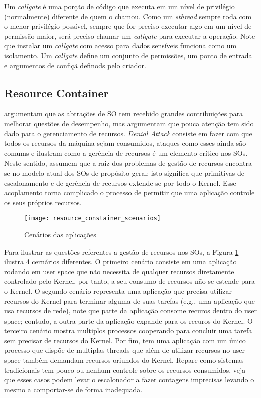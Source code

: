 Um \emph{callgate} é uma porção de código que executa em um nível de privilégio
(normalmente) diferente de quem o chamou. Como um \emph{sthread} sempre roda
com o menor privilégio possível, sempre que for preciso executar algo em um
nível de permissão maior, será preciso chamar um \emph{callgate} para executar
a operação. Note que instalar um \emph{callgate} com acesso para dados
sensíveis funciona como um isolamento. Um \emph{callgate} define um conjunto de
permissões, um ponto de entrada e argumentos de confiçã definods pelo criador.

\subsection{Resource Container}

\cite{resourcecontainers} argumentam que as abtrações de SO tem recebido grandes
contribuições para melhorar questões de desempenho, mas argumentam que pouca
atenção tem sido dado para o gerenciamento de recursos. \emph{Denial Attack}
consiste em fazer com que todos os recursos da máquina sejam consumidos,
ataques como esses ainda são comums e ilustram como a gerência de recursos é
um elemento crítico nos SOs. Neste sentido, \cite{resourcecontainers}
assumem que a raiz dos problemas de gestão de recursos encontra-se no modelo
atual dos SOs de propósito geral; isto significa que primitivas de
escalonamento e de gerência de recursos extende-se por todo o Kernel. Esse
acoplamento torna complicado o processo de permitir que uma aplicação controle
os seus próprios recursos.

\begin{figure}[!h]
  \centering
  \texttt{[image: resource\_constainer\_scenarios]} 
  \caption{Cenários das aplicações}
  \label{fig:resource_constainer_scenarios}
\end{figure}

Para ilustrar as questões referentes a gestão de recursos nos SOs, a Figura
\ref{fig:resource_constainer_scenarios} ilustra 4 cernários diferentes. O
primeiro cenário consiste em uma aplicação rodando em user space que não
necessita de qualquer recursos diretamente controlado pelo Kernel, por tanto, a
seu consumo de recursos não se estende para o Kernel. O segundo cenário
representa uma aplicação que precisa utilizar recursos do Kernel para terminar
alguma de suas tarefas (e.g., uma aplicação que usa recursos de rede), note que
parte da aplicação consome recuros dentro do user space; contudo, a outra parte
da aplicação expande para os recuros do Kernel. O terceiro cenário mostra
multiplos processos cooperando para concluir uma tarefa sem precisar de
recursos do Kernel. Por fim, tem uma aplicação com um único processo que dispõe
de multiplas threads que além de utilizar recursos no user space também
demandam recursos oriundos do Kernel. Repare como sistemas tradicionais tem
pouco ou nenhum controle sobre os recursos consumidos, veja que esses casos
podem levar o escalonador a fazer contagens imprecisas levando o mesmo a
comportar-se de forma inadequada.

